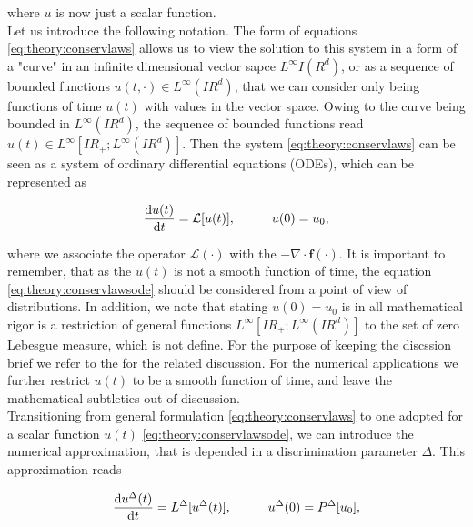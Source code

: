\documentclass[11pt,a4paper,headinclude=true,DIV=14,BCOR=8mm,chapterprefix,listof=totoc,twoside,openright,abstracton]{scrbook}
\begin{document}
where $u$ is now just a scalar function. \\

Let us introduce the following notation. The form of equations \ref{eq:theory:conservlaws} allows us to view the solution to this system in a form of a "curve" in an infinite dimensional vector sapce $L^{\infty}I\!(R^d)$, or as a sequence of bounded functions $u(t,\cdot)\in L^{\infty}(I\! R^d)$, that we can consider only being functions of time $u(t)$ with values in the vector space. Owing to the curve being bounded in $L^{\infty}(I\!R^d)$, the sequence of bounded functions read $u(t)\in L^{\infty}[I\!R_{+};L^{\infty}(I\!R^d)]$. Then the system  \ref{eq:theory:conservlaws} can be seen as a system of ordinary differential equations (ODEs), which can be represented as 

\begin{equation}
    \frac{\text{d}u(t)}{\text{d}t} = \mathcal{L}[u(t)], \hspace{10mm} u(0) = u_0,
    \label{eq:theory:conservlawsode}
\end{equation}

where we associate the operator $\mathcal{L}(\cdot)$ with the $-\nabla\cdot\boldsymbol{f}(\cdot)$. It is important to remember, that as the $u(t)$ is not a smooth function of time, the equation \ref{eq:theory:conservlawsode} should be considered from a point of view of distributions. In addition, we note that stating $u(0) = u_0$ is in all mathematical rigor is a restriction of general functions $L^{\infty}[I\!R_{+};L^{\infty}(I\!R^d)]$ to the set of zero Lebesgue measure, which is not define. For the purpose of keeping the discssion brief we refer to the \cite{Kruzkov:1970} for the related discussion. For the numerical applications we further restrict $u(t)$ to be a smooth function of time, and leave the mathematical subtleties out of discussion.  \\

Transitioning from general formulation \ref{eq:theory:conservlaws} to one adopted for a scalar function $u(t)$ \ref{eq:theory:conservlawsode}, we can introduce the numerical approximation, that is depended in a discrimination parameter $\Delta$. This approximation reads

\begin{equation}
    \frac{\text{d}u^{\Delta}(t)}{\text{d}t} = L^{\Delta}[u^{\Delta}(t)], \hspace{10mm} u^{\Delta}(0) = P^{\Delta}[u_0],
    \label{eq:theory:conservlawsodepde}
\end{equation}
\end{document}

